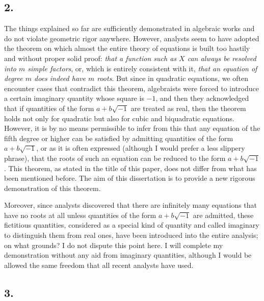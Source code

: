 \documentclass[12pt]{memoir}
\theoremstyle{plain}
\theoremstyle{remark}
\begin{document}
\subsection*{2.}

The things explained so far are sufficiently demonstrated in algebraic works and do not violate geometric rigor anywhere. However, analysts seem to have adopted the theorem on which almost the entire theory of equations is built too hastily and without proper solid proof: \textit{that a function such as \(X\) can always be resolved into \(m\) simple factors}, or, which is entirely consistent with it, \textit{that an equation of degree \(m\) does indeed have \(m\) roots}. But since in quadratic equations, we often encounter cases that contradict this theorem, algebraists were forced to introduce a certain imaginary quantity whose square is \(-1\), and then they acknowledged that if quantities of the form \(a+b\surd{-1}\) are treated as real, then the theorem holds not only for quadratic but also for cubic and biquadratic equations. However, it is by no means permissible to infer from this that any equation of the fifth degree or higher can be satisfied by admitting quantities of the form \(a+b\surd{-1}\), or as it is often expressed (although I would prefer a less slippery phrase), that the roots of such an equation can be reduced to the form \(a+b\surd{-1}\). This theorem, as stated in the title of this paper, does not differ from what has been mentioned before. The aim of this dissertation is to provide a new rigorous demonstration of this theorem.

Moreover, since analysts discovered that there are infinitely many equations that have no roots at all unless quantities of the form \(a+b\surd{-1}\) are admitted, these fictitious quantities, considered as a special kind of quantity and called imaginary to distinguish them from real ones, have been introduced into the entire analysis; on what grounds? I do not dispute this point here.  I will complete my demonstration without any aid from imaginary quantities, although I would be allowed the same freedom that all recent analysts have used.

 \subsection*{3.}
\end{document}
